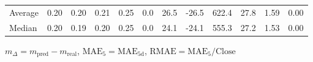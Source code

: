 \begin{threeparttable}
{\begin{tabular}{lrrrrrrrrrrr}
Average &          0.20 &          0.20 &          0.21 &        0.25 &                 0.0 &                26.5 &      -26.5 &               622.4 &             27.8 &            1.59 &                   0.00 \\
 Median &          0.20 &          0.19 &          0.20 &        0.25 &                 0.0 &                24.1 &      -24.1 &               555.3 &             27.2 &            1.53 &                   0.00 \\
\bottomrule
\end{tabular}
}
\begin{tablenotes}\footnotesize
\item $m_\Delta=m_{\text{pred}}-m_{\text{real}}$,
$\mathrm{MAE}_5=\mathrm{MAE}_{5\text{d}}$,
$\mathrm{RMAE}=\mathrm{MAE}_5/\text{Close}$
\end{tablenotes}
\end{threeparttable}
\endgroup

